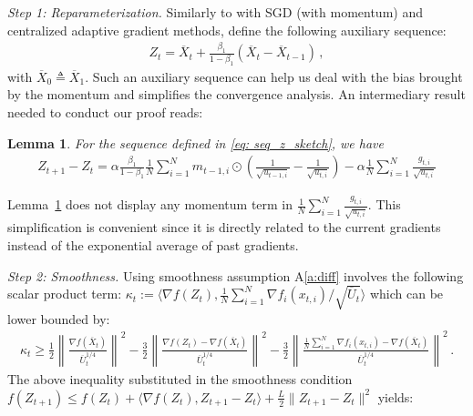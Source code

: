 \documentclass{article} %
\newtheorem{lemma}{Lemma}
\begin{document}
\textsl{Step 1: Reparameterization.} \hspace{0.01in} Similarly to \citep{yan2018unified, chen2018convergence} with SGD (with momentum) and centralized adaptive gradient methods, define the following auxiliary sequence:
 {\small
 \begin{align}\label{eq: seq_z_sketch}
 Z_{t} = \overline X_t + \frac{\beta_1}{1-\beta_1} (\overline X_t - \overline X_{t-1}) \, ,
 \end{align}
 }%
with $\overline X_{0} \triangleq \overline X_1$.
Such an auxiliary sequence can help us deal with the bias brought by the momentum and simplifies the convergence analysis. 
 An intermediary result needed to conduct our proof reads:
 \begin{lemma}\label{lem: z_diff} 
	For the sequence defined in \eqref{eq: seq_z_sketch}, we have
	\begin{align}\label{eq: update_z}
	Z_{t+1} - Z_t = \alpha \frac{\beta_1}{1-\beta_1}  \frac{1}{N} \sum_{i=1}^N m_{t-1	,i} \odot (\frac{1}{\sqrt{u_{t-1,i}}} - \frac{1}{\sqrt{u_{t,i}}}) - \alpha \frac{1}{N} \sum_{i=1}^N \frac{g_{t,i}}{\sqrt{u_{t,i}}}
	\end{align}
\end{lemma}
 Lemma~\ref{lem: z_diff} does not display any momentum term in $\frac{1}{N} \sum_{i=1}^N \frac{g_{t,i}}{\sqrt{u_{t,i}}}$.
 This simplification is convenient since it is directly related to the current gradients instead of the exponential average of past gradients.
 
 \textsl{Step 2: Smoothness.} \hspace{0.01in} Using smoothness assumption A\ref{a:diff} involves the following scalar product term: $\kappa_t := \langle \nabla f( Z_{t}), \frac{1}{N} \sum_{i=1}^N \nabla f_i( x_{t,i})/\sqrt{\overline U_{t}} \rangle$ which can be lower bounded by:
  {\small
 \begin{align} \label{eq: split_1_sketch}
  \kappa_t \geq  \frac{1}{2} \left\|\frac{\nabla f( \overline X_{t})}{\overline U_{t}^{1/4}}\right\|^2   - \frac{3}{2} \left\|\frac{\nabla f( Z_{t}) -\nabla f( \overline X_{t})}{\overline U_{t}^{1/4}}\right\|^2- \frac{3}{2} \left\|  \frac{ \frac{1}{N}\sum_{i=1}^N \nabla f_i( x_{t,i}) -  \nabla f( \overline X_{t})}{\overline U_{t}^{1/4}}  \right\|^2 \, .
 \end{align}
 }%
 The above inequality substituted in the smoothness condition $ f( Z_{t+1}) \leq f( Z_{t}) + \langle \nabla f( Z_{t}),  Z_{t+1}-  Z_{t} \rangle + \frac{L}{2}\| Z_{t+1}-  Z_{t}\|^2 $ yields:
 
\end{document}

